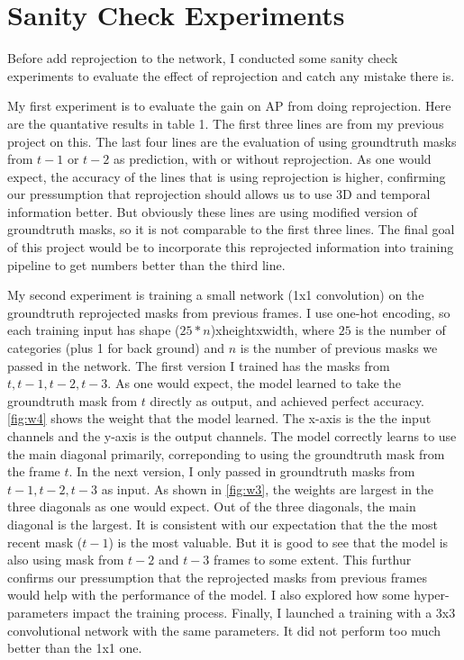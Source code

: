 \section{Sanity Check Experiments}
Before add reprojection to the network, I conducted some sanity check experiments to evaluate the effect of reprojection and catch any mistake there is. 

My first experiment is to evaluate the gain on AP from doing reprojection. Here are the quantative results in table 1. The first three lines are from my previous project on this. The last four lines are the evaluation of using groundtruth masks from $t-1$ or $t-2$ as prediction, with or without reprojection. As one would expect, the accuracy of the lines that is using reprojection is higher, confirming our pressumption that reprojection should allows us to use 3D and temporal information better. But obviously these lines are using modified version of groundtruth masks, so it is not comparable to the first three lines. The final goal of this project would be to incorporate this reprojected information into training pipeline to get numbers better than the third line.

My second experiment is training a small network (1x1 convolution) on the groundtruth reprojected masks from previous frames. I use one-hot encoding, so each training input has shape ($25*n$)xheightxwidth, where $25$ is the number of categories (plus 1 for back ground) and $n$ is the number of previous masks we passed in the network. The first version I trained has the masks from $t,t-1,t-2,t-3$. As one would expect, the model learned to take the groundtruth mask from $t$ directly as output, and achieved perfect accuracy. \ref{fig:w4} shows the weight that the model learned. The x-axis is the the input channels and the y-axis is the output channels. The model correctly learns to use the main diagonal primarily, correponding to using the groundtruth mask from the frame $t$. In the next version, I only passed in groundtruth masks from $t-1,t-2,t-3$ as input. As shown in \ref{fig:w3}, the weights are largest in the three diagonals as one would expect. Out of the three diagonals, the main diagonal is the largest. It is consistent with our expectation that the the most recent mask ($t-1$) is the most valuable. But it is good to see that the model is also using mask from $t-2$ and $t-3$ frames to some extent. This furthur confirms our pressumption that the reprojected masks from previous frames would help with the performance of the model. I also explored how some hyper-parameters impact the training process. Finally, I launched a training with a 3x3 convolutional network with the same parameters. It did not perform too much better than the 1x1 one. 

